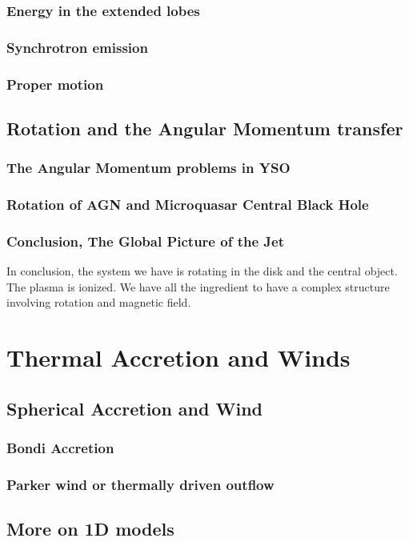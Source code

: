 \documentclass[10pt,a4paper,english,draft]{article}
\begin{document}
\subsubsection{Energy in the extended lobes}
\subsubsection{Synchrotron emission}
\subsubsection{Proper motion}

\subsection{Rotation and the Angular Momentum transfer}
\subsubsection{The Angular Momentum problems in YSO}
\subsubsection{Rotation of AGN and Microquasar Central Black Hole}
\subsubsection{Conclusion, The Global Picture of the Jet}

In conclusion, the system we have is rotating in the disk and the central
object. The plasma is ionized. We have all the ingredient to have a complex
structure involving rotation and magnetic field.

\section{Thermal Accretion and Winds}
\subsection{Spherical Accretion and Wind}
\subsubsection{Bondi Accretion}
\subsubsection{Parker wind or thermally driven outflow}
\subsection{More on 1D models}
\end{document}
